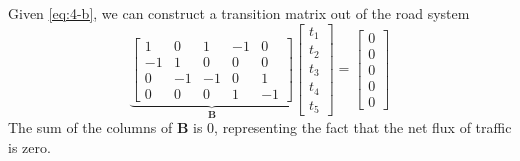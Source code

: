\documentclass[]{article}
\numberwithin{equation}{section}
\begin{document}
Given \autoref{eq:4-b}, we can construct a transition matrix out of the road system
\begin{equation}
	\underbrace{\begin{bmatrix}
	1 & 0 & 1 & -1 & 0 \\
	-1 & 1 & 0 & 0 & 0 \\
	0 & -1 & -1 & 0 & 1 \\
	0 & 0 & 0 & 1 & -1
	\end{bmatrix}}_{\mathbf{B}}
	\begin{bmatrix}
	t_1 \\
	t_2 \\
	t_3 \\
	t_4 \\
	t_5
	\end{bmatrix}
	= 
	\begin{bmatrix}
	0 \\
	0 \\
	0 \\
	0 \\
	0
	\end{bmatrix}
\end{equation}
The sum of the columns of \(\mathbf{B}\) is 0, representing the fact that the net flux of traffic is zero. 

\subsection{}
\end{document}
